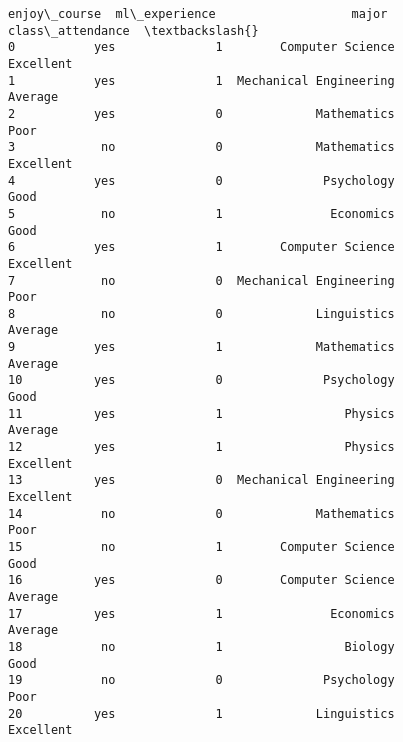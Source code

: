 \documentclass[11pt]{article}
\makeatletter
\newcommand{\boxspacing}{\kern\kvtcb@left@rule\kern\kvtcb@boxsep}
\newcommand{\prompt}[4]{
        {\ttfamily\llap{{\color{#2}[#3]:\hspace{3pt}#4}}\vspace{-\baselineskip}}
    }
\makeatother
\begin{document}
            \begin{tcolorbox}[breakable, size=fbox, boxrule=.5pt, pad at break*=1mm, opacityfill=0]
\prompt{Out}{outcolor}{2}{\boxspacing}
\begin{Verbatim}[commandchars=\\\{\}]
   enjoy\_course  ml\_experience                   major class\_attendance  \textbackslash{}
0           yes              1        Computer Science        Excellent
1           yes              1  Mechanical Engineering          Average
2           yes              0             Mathematics             Poor
3            no              0             Mathematics        Excellent
4           yes              0              Psychology             Good
5            no              1               Economics             Good
6           yes              1        Computer Science        Excellent
7            no              0  Mechanical Engineering             Poor
8            no              0             Linguistics          Average
9           yes              1             Mathematics          Average
10          yes              0              Psychology             Good
11          yes              1                 Physics          Average
12          yes              1                 Physics        Excellent
13          yes              0  Mechanical Engineering        Excellent
14           no              0             Mathematics             Poor
15           no              1        Computer Science             Good
16          yes              0        Computer Science          Average
17          yes              1               Economics          Average
18           no              1                 Biology             Good
19           no              0              Psychology             Poor
20          yes              1             Linguistics        Excellent


\end{Verbatim}
\end{tcolorbox}
\end{document}
